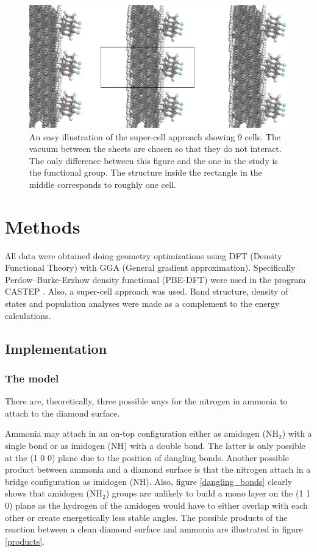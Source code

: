 \documentclass[12pt,a4paper]{article}
\begin{document}
\begin{figure} \captionsetup{width=.8\linewidth} \caption{An easy illustration of the super-cell approach showing 9 cells. The vacuum between the sheets are chosen so that they do not interact. The only difference between this figure and the one in the study is the functional group. The structure inside the rectangle in the middle corresponds to roughly one cell.} \label{supercell}
%
\includegraphics[width=.8\linewidth]{pictures/supercellvacuum.png}
\end{figure}

\section{Methods}
All data were obtained doing geometry optimizations using DFT (Density Functional Theory) with GGA (General gradient approximation). Specifically Perdow--Burke-Erzhow density functional (PBE-DFT) were used in the program CASTEP \cite{castep}. Also, a super-cell approach was used. Band structure, density of states and population analyses were made as a complement to the energy calculations. 

\subsection{Implementation}
\subsubsection{The model}
There are, theoretically, three possible ways for the nitrogen in ammonia to attach to the diamond surface.  

Ammonia may attach in an on-top configuration either as amidogen (NH$_2$) with a single bond or as imidogen (NH) with a double bond. The latter is only possible at the (1 0 0) plane due to the position of dangling bonds. Another possible product between ammonia and a diamond surface is that the nitrogen  attach in a bridge configuration as imidogen (NH).  Also, figure \ref{dangling_bonds}  clearly shows that amidogen (NH$_2$) groups are unlikely to build a mono layer on the (1 1 0) plane as the hydrogen of the amidogen would have to either overlap with each other or create energetically less stable angles. The possible products of the reaction between a clean diamond surface and ammonia are illustrated in figure \ref{products}.
\end{document}
